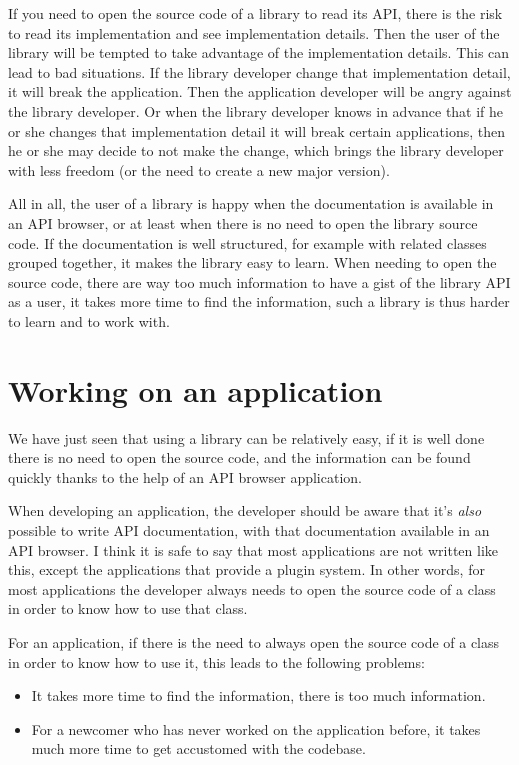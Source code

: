 \documentclass[a4paper,11pt]{article}
\begin{document}
If you need to open the source code of a library to read its API, there is the risk to read its implementation and see implementation details. Then the user of the library will be tempted to take advantage of the implementation details. This can lead to bad situations. If the library developer change that implementation detail, it will break the application. Then the application developer will be angry against the library developer. Or when the library developer knows in advance that if he or she changes that implementation detail it will break certain applications, then he or she may decide to not make the change, which brings the library developer with less freedom (or the need to create a new major version).

All in all, the user of a library is happy when the documentation is available in an API browser, or at least when there is no need to open the library source code. If the documentation is well structured, for example with related classes grouped together, it makes the library easy to learn. When needing to open the source code, there are way too much information to have a gist of the library API as a user, it takes more time to find the information, such a library is thus harder to learn and to work with.

\section{Working on an application}

We have just seen that using a library can be relatively easy, if it is well done there is no need to open the source code, and the information can be found quickly thanks to the help of an API browser application.

When developing an application, the developer should be aware that it's \emph{also} possible to write API documentation, with that documentation available in an API browser. I think it is safe to say that most applications are not written like this, except the applications that provide a plugin system. In other words, for most applications the developer always needs to open the source code of a class in order to know how to use that class.

For an application, if there is the need to always open the source code of a class in order to know how to use it, this leads to the following problems:
\begin{itemize}
  \item It takes more time to find the information, there is too much information.
  \item For a newcomer who has never worked on the application before, it takes much more time to get accustomed with the codebase.
\end{itemize}
\end{document}

